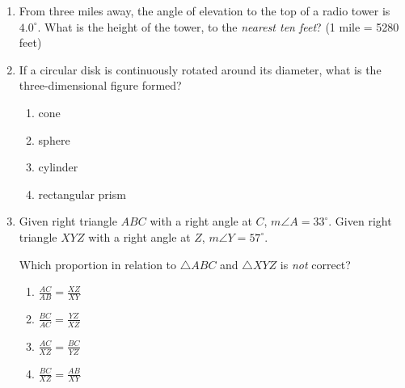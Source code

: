 \documentclass[12pt, oneside]{article}
\begin{document}
\begin{enumerate}[itemsep=1.2cm]
\newpage
\item From three miles away, the angle of elevation to the top of a radio tower is $4.0^\circ$. What is the height of the tower, to the \emph{nearest ten feet}? (1 mile = 5280 feet)
  \begin{center}
  \end{center}

\item If a circular disk is continuously rotated around its diameter, what is the three-dimensional figure formed?
  \begin{multicols}{2}
  \begin{enumerate}
    \item cone
    \item sphere
    \item cylinder
    \item rectangular prism
  \end{enumerate}
\end{multicols}

\item Given right triangle $ABC$ with a right angle at $C$, $m\angle A=33^\circ$. Given right triangle $XYZ$ with a right angle at $Z$, $m\angle Y=57^\circ$.
  \begin{center}
  \end{center}
Which proportion in relation to $\triangle ABC$ and $\triangle XYZ$ is \emph{not} correct?
  \begin{multicols}{2}
    \begin{enumerate}
      \item $\displaystyle \frac{AC}{AB} = \frac{XZ}{XY}$
      \item $\displaystyle \frac{BC}{AC} = \frac{YZ}{XZ}$ 
      \item $\displaystyle \frac{AC}{XZ} = \frac{BC}{YZ}$
      \item $\displaystyle \frac{BC}{XZ} = \frac{AB}{XY}$
    \end{enumerate}
  \end{multicols}

\end{enumerate}
\end{document}
